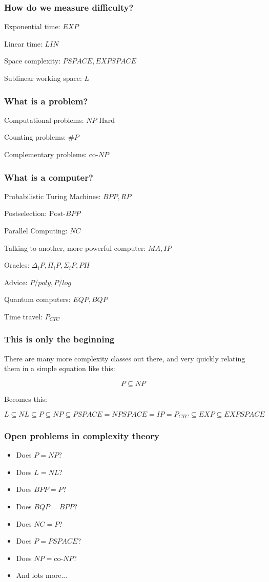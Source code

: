 \documentclass[aspectratio=169]{beamer}
\begin{document}
\begin{frame}
\frametitle{How do we measure difficulty?}
Exponential time: $EXP$

Linear time: $LIN$

Space complexity: $PSPACE, EXPSPACE$

Sublinear working space: $L$
\end{frame}

\begin{frame}
\frametitle{What is a problem?}
Computational problems: $NP\text{-Hard}$

Counting problems: $\#P$

Complementary problems: $\text{co-}NP$
\end{frame}

\begin{frame}
\frametitle{What is a computer?}
Probabilistic Turing Machines: $BPP, RP$

Postselection: $\text{Post-}BPP$

Parallel Computing: $NC$

Talking to another, more powerful computer: $MA, IP$

Oracles: $\Delta_iP, \Pi_iP, \Sigma_iP, PH$

Advice: $P/poly, P/log$

Quantum computers:  $EQP, BQP$

Time travel: $P_{CTC}$
\end{frame}

\begin{frame}
\frametitle{This is only the beginning}
There are many more complexity classes out there, and very quickly relating them in a simple equation like this:

$$P \subseteq NP$$

Becomes this:

$$L \subseteq NL \subseteq P \subseteq NP \subseteq PSPACE = NPSPACE = IP = P_{CTC} \subseteq EXP \subseteq EXPSPACE$$
\end{frame}

\begin{frame}
\frametitle{Open problems in complexity theory}
\begin{itemize}
	\item<1-> Does $P = NP$?
	\item<2-> Does $L = NL$?
	\item<3-> Does $BPP = P$?
	\item<4-> Does $BQP = BPP$?
	\item<5-> Does $NC = P$?
	\item<6-> Does $P = PSPACE$?
	\item<7-> Does $NP = \text{co-}NP$?
	\item<8-> And lots more...
\end{itemize}
\end{frame}
\end{document}
